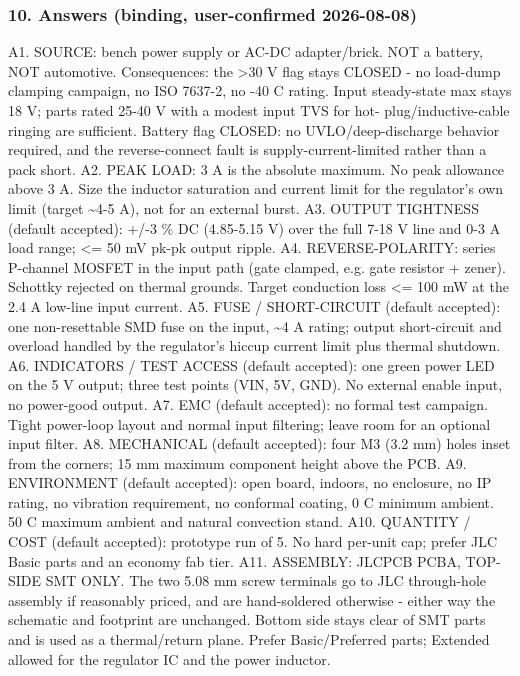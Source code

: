 \documentclass[11pt,a4paper]{article}
\begin{document}
\subsubsection*{10. Answers (binding, user-confirmed 2026-08-08)}
A1. SOURCE: bench power supply or AC-DC adapter/brick. NOT a battery, NOT automotive. Consequences: the \textgreater{}30 V flag stays CLOSED - no load-dump clamping campaign, no ISO 7637-2, no -40 C rating. Input steady-state max stays 18 V; parts rated 25-40 V with a modest input TVS for hot- plug/inductive-cable ringing are sufficient. Battery flag CLOSED: no UVLO/deep-discharge behavior required, and the reverse-connect fault is supply-current-limited rather than a pack short. A2. PEAK LOAD: 3 A is the absolute maximum. No peak allowance above 3 A. Size the inductor saturation and current limit for the regulator's own limit (target \textasciitilde{}4-5 A), not for an external burst. A3. OUTPUT TIGHTNESS (default accepted): +/-3 \% DC (4.85-5.15 V) over the full 7-18 V line and 0-3 A load range; \textless{}= 50 mV pk-pk output ripple. A4. REVERSE-POLARITY: series P-channel MOSFET in the input path (gate clamped, e.g. gate resistor + zener). Schottky rejected on thermal grounds. Target conduction loss \textless{}= 100 mW at the 2.4 A low-line input current. A5. FUSE / SHORT-CIRCUIT (default accepted): one non-resettable SMD fuse on the input, \textasciitilde{}4 A rating; output short-circuit and overload handled by the regulator's hiccup current limit plus thermal shutdown. A6. INDICATORS / TEST ACCESS (default accepted): one green power LED on the 5 V output; three test points (VIN, 5V, GND). No external enable input, no power-good output. A7. EMC (default accepted): no formal test campaign. Tight power-loop layout and normal input filtering; leave room for an optional input filter. A8. MECHANICAL (default accepted): four M3 (3.2 mm) holes inset from the corners; 15 mm maximum component height above the PCB. A9. ENVIRONMENT (default accepted): open board, indoors, no enclosure, no IP rating, no vibration requirement, no conformal coating, 0 C minimum ambient. 50 C maximum ambient and natural convection stand. A10. QUANTITY / COST (default accepted): prototype run of 5. No hard per-unit cap; prefer JLC Basic parts and an economy fab tier. A11. ASSEMBLY: JLCPCB PCBA, TOP-SIDE SMT ONLY. The two 5.08 mm screw terminals go to JLC through-hole assembly if reasonably priced, and are hand-soldered otherwise - either way the schematic and footprint are unchanged. Bottom side stays clear of SMT parts and is used as a thermal/return plane. Prefer Basic/Preferred parts; Extended allowed for the regulator IC and the power inductor.
\end{document}
